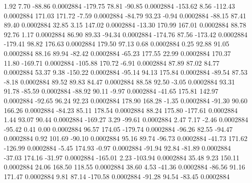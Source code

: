        1.92        7.70      -88.86     0.0002884
     -179.75       78.81      -90.85     0.0002884
     -153.62        8.56     -112.43     0.0002884
      171.03      171.72       -7.59     0.0002884
      -84.79       93.23       -0.94     0.0002884
      -88.15       87.41       89.40     0.0002884
       32.85        3.15      147.02     0.0002884
      -13.30      170.99      167.01     0.0002884
       88.78       92.76        1.17     0.0002884
       86.90       89.33      -94.34     0.0002884
     -174.76       87.56     -173.42     0.0002884
     -179.41       98.82      176.63     0.0002884
      179.50       97.13        0.68     0.0002884
        0.25       92.88       91.05     0.0002884
       88.16       89.94      -82.42     0.0002884
      -65.23      177.55       22.99     0.0002884
      170.37       11.80     -169.71     0.0002884
     -105.88      170.72       -6.91     0.0002884
       87.89       87.02       84.77     0.0002884
       53.37        9.38     -150.22     0.0002884
      -95.14       94.13      175.84     0.0002884
      -89.54       87.53       -8.18     0.0002884
       89.52       89.83       84.47     0.0002884
       88.58       92.50       -3.05     0.0002884
       93.31       91.78      -85.59     0.0002884
      -88.92       90.11       -9.97     0.0002884
      -41.65      175.81      142.97     0.0002884
      -92.65       96.24       92.23     0.0002884
      178.90      168.28       -1.35     0.0002884
      -91.30       90.60      166.26     0.0002884
      -84.23       85.11      178.54     0.0002884
       88.24      175.80     -177.61     0.0002884
        1.44       93.07       90.44     0.0002884
     -169.27        3.29      -99.61     0.0002884
        2.47        7.17       -2.46     0.0002884
      -95.42        0.41        0.00     0.0002884
       96.57      174.05     -179.74     0.0002884
      -96.26       82.55      -94.47     0.0002884
        0.92      101.69      -90.10     0.0002884
       95.16       89.74      -96.73     0.0002884
      -41.73      171.62     -126.99     0.0002884
       -5.45      174.93       -0.97     0.0002884
      -91.94       92.84      -81.89     0.0002884
      -37.03      174.16      -31.97     0.0002884
     -165.01        2.23     -103.94     0.0002884
       35.48        9.23      150.11     0.0002884
       24.06      168.50      118.55     0.0002884
       38.60        4.53      -41.36     0.0002884
      -86.56       91.16      171.47     0.0002884
        9.81       87.14     -170.58     0.0002884
      -91.28       94.54      -83.45     0.0002884
